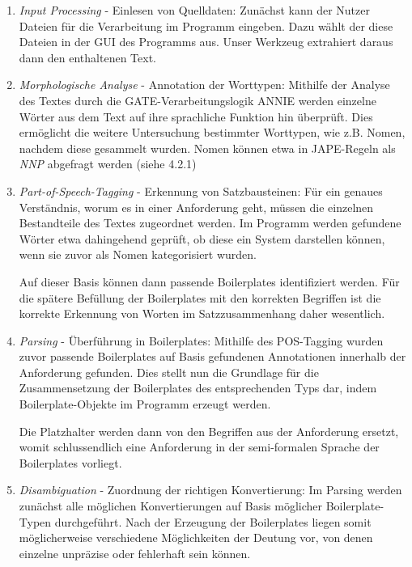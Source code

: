 \documentclass[12pt]{report}
\begin{document}
\begin{enumerate}
\item \textit{Input Processing} - Einlesen von Quelldaten: Zunächst kann der Nutzer Dateien für die Verarbeitung im Programm eingeben. Dazu wählt der diese Dateien in der GUI des Programms aus. Unser Werkzeug extrahiert daraus dann den enthaltenen Text.

\item \textit{Morphologische Analyse} - Annotation der Worttypen: Mithilfe der Analyse des Textes durch die GATE-Verarbeitungslogik ANNIE werden einzelne Wörter aus dem Text auf ihre sprachliche Funktion hin überprüft. Dies ermöglicht die weitere Untersuchung bestimmter Worttypen, wie z.B. Nomen, nachdem diese gesammelt wurden. Nomen können etwa in JAPE-Regeln als \textit{NNP} abgefragt werden (siehe 4.2.1)

\item \textit{Part-of-Speech-Tagging} - Erkennung von Satzbausteinen: Für ein genaues Verständnis, worum es in einer Anforderung geht, müssen die einzelnen Bestandteile des Textes zugeordnet werden. Im Programm werden gefundene Wörter etwa dahingehend geprüft, ob diese ein System darstellen können, wenn sie zuvor als Nomen kategorisiert wurden. 

Auf dieser Basis können dann passende Boilerplates identifiziert werden. Für die spätere Befüllung der Boilerplates mit den korrekten Begriffen ist die korrekte Erkennung von Worten im Satzzusammenhang daher wesentlich.

\item \textit{Parsing} - Überführung in Boilerplates: Mithilfe des POS-Tagging wurden zuvor passende Boilerplates auf Basis gefundenen Annotationen innerhalb der Anforderung gefunden. Dies stellt nun die Grundlage für die Zusammensetzung der Boilerplates des entsprechenden Typs dar, indem Boilerplate-Objekte im Programm erzeugt werden. 

Die Platzhalter werden dann von den Begriffen aus der Anforderung ersetzt, womit schlussendlich eine Anforderung in der semi-formalen Sprache der Boilerplates vorliegt.

\item \textit{Disambiguation} - Zuordnung der richtigen Konvertierung: Im Parsing werden zunächst alle möglichen Konvertierungen auf Basis möglicher Boilerplate-Typen durchgeführt. Nach der Erzeugung der Boilerplates liegen somit möglicherweise verschiedene Möglichkeiten der Deutung vor, von denen einzelne unpräzise oder fehlerhaft sein können. 


\end{enumerate}
\end{document}
